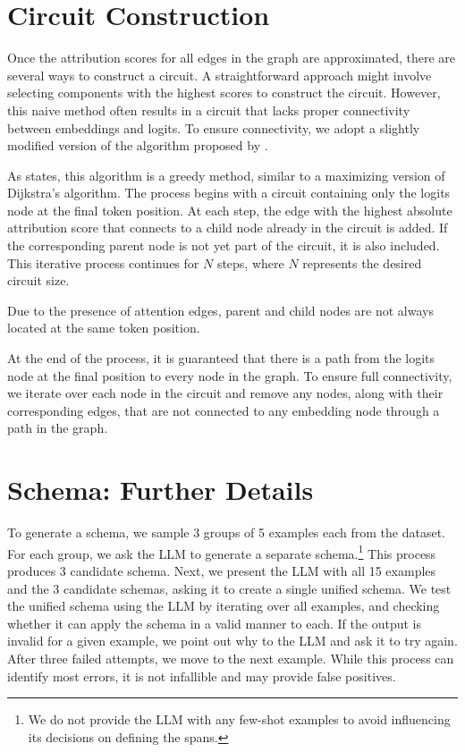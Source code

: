 \section{Circuit  Construction} \label{ap:circuit construcion}

Once the attribution scores for all edges in the graph are approximated, there are several ways to construct a circuit. A straightforward approach might involve selecting components with the highest scores to construct the circuit. However, this naive method often results in a circuit that lacks proper connectivity between embeddings and logits. To ensure connectivity, we adopt a slightly modified version of the algorithm proposed by \citet{hanna2024have}.

As \citet{hanna2024have} states, this algorithm is a greedy method, similar to a maximizing version of Dijkstra’s algorithm. The process begins with a circuit containing only the logits node at the final token position. At each step, the edge with the highest absolute attribution score that connects to a child node already in the circuit is added. If the corresponding parent node is not yet part of the circuit, it is also included. This iterative process continues for $N$ steps, where $N$ represents the desired circuit size.

Due to the presence of attention edges, parent and child nodes are not always located at the same token position.

At the end of the process, it is guaranteed that there is a path from the logits node at the final position to every node in the graph. To ensure full connectivity, we iterate over each node in the circuit and remove any nodes, along with their corresponding edges, that are not connected to any embedding node through a path in the graph. 

\section{Schema: Further Details}\label{ap:schema generation}
To generate a schema, we sample 3 groups of 5 examples each from the dataset. For each group, we ask the LLM to generate a separate schema.\footnote{We do not provide the LLM with any few-shot examples to avoid influencing its decisions on  defining the spans.} This process produces 3 candidate schema.
Next, we present the LLM with all 15 examples and the 3 candidate schemas, asking it to create a single unified schema. We test the unified schema using the LLM by iterating over all examples, and checking whether it can apply the schema in a valid manner to each.
If the output is invalid for a given example, we point out why to the LLM and ask it to try again. After three failed attempts, we move to the next example. While this process can identify most errors, it is not infallible and may provide false positives.

